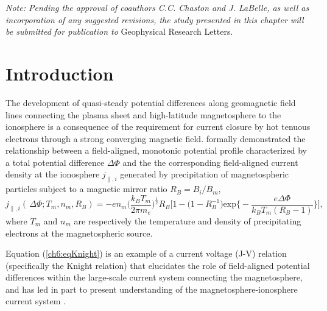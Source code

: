 \textit{Note: Pending the approval of coauthors C.C. Chaston and
  J. LaBelle, as well as incorporation of any suggested revisions, the
  study presented in this chapter will be submitted for publication
  to} Geophysical Research Letters.

  \section{Introduction}

  The development of quasi-steady potential differences along geomagnetic field
  lines connecting the plasma sheet and high-latitude magnetosphere to the
  ionosphere is a consequence of the requirement for current closure by hot
  tenuous electrons through a strong converging magnetic
  field. \citet{Knight1973} formally demonstrated the relationship between a
  field-aligned, monotonic potential profile characterized by a total potential
  difference $\Delta \Phi$ and the the corresponding field-aligned current
  density at the ionosphere $j_{\parallel,i}$ generated by precipitation of
  magnetospheric particles subject to a magnetic mirror ratio $R_B = B_{i} /
  B_{m}$,
  \begin{equation} \label{ch6:eqKnight} j_{\parallel,i} ( \, \Delta \Phi ; T_m,
    n_m, R_B ) = - e n_m \Big ( \dfrac{k_B T_m}{2 \pi m_e} \Big )^{\frac{1}{2}}
    R_B \Bigg [ 1 - \Big ( 1 - R_B^{-1} \Big ) \textrm{exp} \Big \{ - \dfrac{e
      \Delta \Phi}{k_B T_m ( R_B - 1 )} \Big \} \Bigg],
  \end{equation}
  where $T_m$ and $n_m$ are respectively the temperature and density of
  precipitating electrons at the magnetospheric source.


  Equation (\ref{ch6:eqKnight}) is an example of a current voltage (J-V)
  relation (specifically the Knight relation) that elucidates the role of
  field-aligned potential differences within the large-scale current system
  connecting the magnetosphere, and has led in part to present understanding of
  the magnetosphere-ionosphere current system
  \citep[e.g.,][]{Temerin1997,Hultqvist1999,Cowley2000,Bostrom2003a,Paschmann2003,Pierrard2007a,Karlsson2012}.

